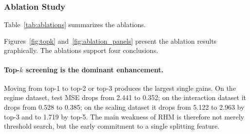 \documentclass[11pt,a4paper]{article}
\begin{document}
\subsubsection{Ablation Study}

Table~\ref{tab:ablations} summarizes the ablations.

\begin{table}[ht]
\centering
\caption{Ablation study: test MSE across datasets.}\label{tab:ablations}
\end{table}

Figures~\ref{fig:topk} and~\ref{fig:ablation_panels} present the ablation results graphically. The ablations support four conclusions.

\paragraph{Top-$k$ screening is the dominant enhancement.}
Moving from top-1 to top-2 or top-3 produces the largest single gains. On the regime dataset, test MSE drops from 2.441 to 0.352; on the interaction dataset it drops from 0.528 to 0.385; on the scaling dataset it drops from 5.122 to 2.963 by top-3 and to 1.719 by top-5. The main weakness of RHM is therefore not merely threshold search, but the early commitment to a single splitting feature.
\end{document}
